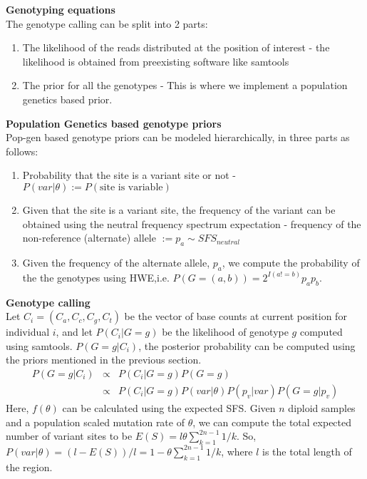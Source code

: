 \documentclass[12pt]{article}
\begin{document}
\flushleft
\textbf{Genotyping equations}\\
The genotype calling can be split into 2 parts:\\
\begin{enumerate}
\item The likelihood of the reads distributed at the position of interest - the likelihood is obtained from preexisting software like samtools
\item The prior for all the genotypes - This is where we implement a population genetics based prior.
\end{enumerate}

\textbf{Population Genetics based genotype priors}\\
Pop-gen based genotype priors can be modeled hierarchically, in three parts as follows:
\begin{enumerate}
\item Probability that the site is a variant site or not - $P(var|\theta) := P(\textrm{site is variable})$
\item Given that the site is a variant site, the frequency of the variant can be obtained using the neutral frequency spectrum expectation - frequency of the non-reference (alternate) allele $:= p_a  \sim SFS_{neutral}$
\item Given the frequency of the alternate allele, $p_a$, we compute the probability of the the genotypes using HWE,i.e. $P(G = (a,b)) = 2^{I(a!=b)}p_ap_b$.

\end{enumerate}
\textbf{Genotype calling}\\
Let $C_i = (C_a, C_c, C_g, C_t)$ be the vector of base counts at current position for individual $i$, and let $P(C_i | G=g)$ be the likelihood of genotype $g$ computed using samtools. $P(G=g|C_i)$, the posterior probability can be computed using the priors mentioned in the previous section.\\
\begin{eqnarray}
P(G=g|C_i) &\propto& P(C_i|G=g)P(G = g) \nonumber \\
		  &\propto& P(C_i|G=g)P(var|\theta)P(p_v|var)P(G=g|p_v)
\label{eqn:post}
\end{eqnarray}
Here, $f(\theta)$ can be calculated using the expected SFS. Given $n$ diploid samples and a population scaled mutation rate of $\theta$, we can compute the total expected number of variant sites to be $E(S) = l\theta\sum_{k=1}^{2n-1}1/k$. So, $P(var|\theta)= (l-E(S))/l = 1 - \theta\sum_{k=1}^{2n-1}1/k$, where $l$ is the total length of the region. \\
\end{document}
